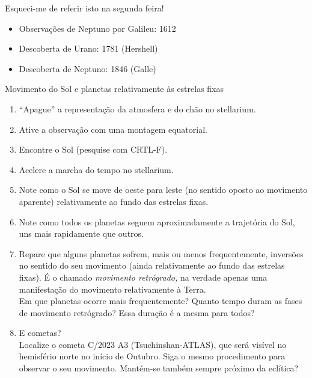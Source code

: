 \documentclass[beamer,9pt,aspectratio=169]{beamer}
\begin{document}
\begin{frame}{Esqueci-me de referir isto na segunda feira!}
\begin{itemize}
  \item Observações de Neptuno por Galileu: 1612
    \vspace{2em}
  \item Descoberta de Urano: 1781 (Hershell)
    \vspace{2em}
  \item Descoberta de Neptuno: 1846 (Galle)
\end{itemize}
\end{frame}
\begin{frame}{Movimento do Sol e planetas relativamente às estrelas fixas}
  \begin{enumerate}
    \setlength{\itemsep}{0.9em}
    \item ``Apague'' a representação da atmosfera e do chão no stellarium.
    \item Ative a observação com uma montagem equatorial.
    \item Encontre o Sol (pesquise com CRTL-F).
    \item Acelere a marcha do tempo no stellarium.
    \item Note como o Sol se move de oeste para leste (no sentido oposto ao
      movimento aparente) relativamente ao fundo das estrelas fixas.
    \item Note como todos os planetas seguem aproximadamente a trajetória do Sol,
      uns mais rapidamente que outros.
    \item Repare que alguns planetas sofrem, mais ou menos frequentemente,
      inversões no sentido do seu movimento (ainda relativamente ao fundo das
      estrelas fixas). É o chamado \emph{movimento retrógrado,} na verdade
      apenas uma manifestação do movimento relativamente à Terra.\\
      {\small\textsf{%
      Em que planetas ocorre mais frequentemente? Quanto tempo duram as fases de
      movimento retrógrado? Essa duração é a mesma para todos?
      }}
    \item
      E cometas?\\ Localize o cometa C/2023 A3 (Tsuchinshan-ATLAS), que será
      visível no hemisfério norte no início de Outubro. Siga o mesmo
      procedimento para observar o seu movimento. Mantém-se também sempre
      próximo da eclítica?
  \end{enumerate}
\end{frame}
\end{document}
